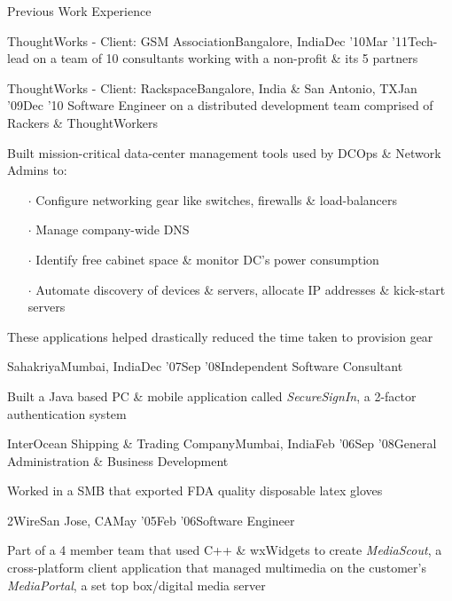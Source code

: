 \documentclass{resume} %
\begin{document}
\begin{rSection}{Previous Work Experience}
\begin{rSubsection}{ThoughtWorks - Client: GSM Association}{Bangalore, India}{Dec '10}{Mar '11}{Tech-lead on a team of 10 consultants working with a non-profit
  \& its 5 partners}
\end{rSubsection}



\begin{rSubsection}{ThoughtWorks - Client: Rackspace}{Bangalore, India \& San Antonio,
  TX}{Jan '09}{Dec '10}
{Software Engineer on a distributed development team comprised of Rackers \& ThoughtWorkers}

\item Built mission-critical data-center management tools used by DCOps \& Network Admins to:
\vspace{-0.5em}
\begin{itemize}  \itemsep0.5pt \parskip0pt
    \item[$\cdot$] Configure networking gear like switches, firewalls \& load-balancers
    \item[$\cdot$] Manage company-wide DNS
    \item[$\cdot$] Identify free cabinet space \& monitor DC's power consumption
    \item[$\cdot$] Automate discovery of devices \& servers, allocate IP addresses \& kick-start servers
\end{itemize}
\item These applications helped drastically reduced the time taken to provision gear
\end{rSubsection}


\begin{rSubsection}{Sahakriya}{Mumbai, India}{Dec '07}{Sep '08}{Independent Software Consultant}
\item Built a Java based PC \& mobile application called {\em SecureSignIn}, a 2-factor authentication system

\end{rSubsection}


\begin{rSubsection}{InterOcean Shipping \& Trading Company}{Mumbai,
    India}{Feb '06}{Sep '08}{General Administration \& Business Development}
\item Worked in a SMB that exported FDA quality disposable latex gloves
\end{rSubsection}


\begin{rSubsection}{2Wire}{San Jose, CA}{May '05}{Feb '06}{Software Engineer}
\item Part of a 4 member team that used C++ \& wxWidgets to create {\em MediaScout}, a cross-platform client application that managed multimedia on the customer's {\em MediaPortal}, a set top box/digital media server
\end{rSubsection}

\end{rSection}
\end{document}
